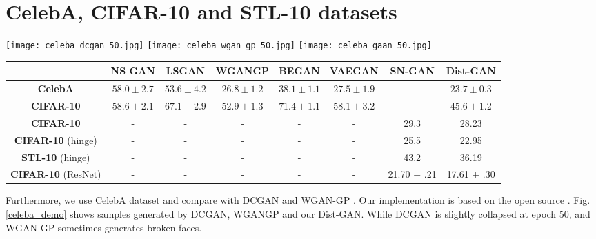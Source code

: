 \documentclass[runningheads]{llncs}
\begin{document}
\section{CelebA, CIFAR-10 and STL-10 datasets}
\begin{figure*}[t]
\centering
\texttt{[image: celeba\_dcgan\_50.jpg]}
\texttt{[image: celeba\_wgan\_gp\_50.jpg]}
\texttt{[image: celeba\_gaan\_50.jpg]}
\caption{Generated samples of DCGAN (50 epochs, results from \cite{gan_source}), WGAN-GP (50 epochs, results from \cite{gan_source}) and our Dist-GAN (50 epochs).}
\label{celeba_demo}
\end{figure*}
\begin{table*}[t]
\centering
\scriptsize
\caption{Comparing FID score to other methods. First two rows (CelebA, CIFAR-10) follow the experimental setup of \cite{lucic-2017-arxiv}, and the second row follow the experimental setup of \cite{miyato-iclr-2018} with standard CNN architectures, and the last row is with ResNet architecture.}
\begin{tabular}{c | c | c | c | c | c | c | c}
           & \textbf{NS GAN} & \textbf{LSGAN} & \textbf{WGANGP} & \textbf{BEGAN} & \textbf{VAEGAN} & \textbf{SN-GAN} & \textbf{Dist-GAN} \\
\hline
\textbf{CelebA}    & $58.0 \pm 2.7$  & $53.6 \pm 4.2$ & $26.8 \pm 1.2$  & $38.1 \pm 1.1$ & $27.5
 \pm 1.9$ & - & $23.7\pm 0.3$  \\
\textbf{CIFAR-10}     & $58.6 \pm 2.1$ & $67.1 \pm 2.9$ & $52.9 \pm 1.3$ &  $71.4 \pm 1.1$ & $58.1	\pm 3.2$ & - & $45.6 \pm 1.2$  \\
\hline
\textbf{CIFAR-10}     & - & - & - &  - & - & 29.3 & 28.23 \\
\textbf{CIFAR-10} (hinge) & - & - & - & - & - & 25.5 & 22.95 \\
\textbf{STL-10} (hinge) & - & - & - & - & - & 43.2 & 36.19\\
\hline
\textbf{CIFAR-10} (ResNet) & - & - & - & - & - & 21.70 $\pm$ .21 & 17.61 $\pm$ .30 \\
\end{tabular}
\label{fid_score}
\end{table*}
Furthermore, we use CelebA dataset and compare with DCGAN \cite{radford-arxiv-2015} and WGAN-GP \cite{gulrajani-arxiv-2017}. Our implementation is based on the open source \cite{gan_source_b,gan_source}.
Fig. \ref{celeba_demo} shows samples generated by DCGAN, WGANGP and our Dist-GAN. While DCGAN is slightly collapsed at epoch 50, and WGAN-GP sometimes generates broken faces.
\end{document}
